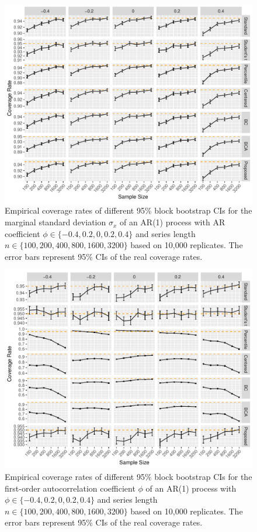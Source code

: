 \documentclass[12pt, letterpaper, titlepage]{article}
\begin{document}
\begin{figure}[tbp]
  \centering
  \includegraphics[width=\textwidth]{figures/plot_sigma}
  \caption{Empirical coverage rates of different 95\% block bootstrap CIs for
    the marginal standard deviation $\sigma_x$ of an AR(1) 
		process with AR
    coefficient $\phi \in \{-0.4, 0.2, 0, 0.2, 0.4\}$ and series length
    $n \in \{100, 200, 400, 800, 1600, 3200\}$ based on 10,000 replicates.
    The error bars represent 95\% CIs of the real coverage rates.}
  \label{fig:sigma}
\end{figure}

\begin{figure}[tbp]
  \centering
  \includegraphics[width=\textwidth]{figures/plot_phi}
  \caption{Empirical coverage rates of different 95\% block bootstrap CIs for
    the first-order autocorrelation coefficient $\phi$ of an AR(1) process with
    $\phi \in \{-0.4, 0.2, 0, 0.2, 0.4\}$ and series length
    $n \in \{100, 200, 400, 800, 1600, 3200\}$ based on 10,000 replicates.
    The error bars represent 95\% CIs of the real coverage rates.}
  \label{fig:phi}
\end{figure}
\end{document}
